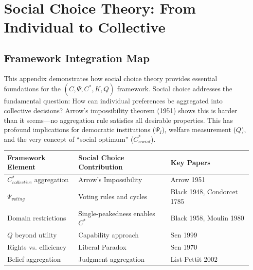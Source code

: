\section{Social Choice Theory: From Individual to Collective}
\label{app:social-choice}

\subsection{Framework Integration Map}

This appendix demonstrates how social choice theory provides essential 
foundations for the $(C, \Psi, C^*, K, Q)$ framework. Social choice addresses 
the fundamental question: How can individual preferences be aggregated into 
collective decisions? Arrow's impossibility theorem (1951) shows this is 
harder than it seems---no aggregation rule satisfies all desirable properties. 
This has profound implications for democratic institutions ($\Psi_I$), welfare 
measurement ($Q$), and the very concept of ``social optimum'' ($C^*_{social}$).

\begin{center}
\renewcommand{\arraystretch}{1.4}
\begin{tabular}{|l|l|l|}
\hline
\textbf{Framework Element} & \textbf{Social Choice Contribution} & \textbf{Key Papers} \\
\hline
$C^*_{collective}$ aggregation & Arrow's Impossibility & Arrow 1951 \\
$\Psi_{voting}$ & Voting rules and cycles & Black 1948, Condorcet 1785 \\
Domain restrictions & Single-peakedness enables $C^*$ & Black 1958, Moulin 1980 \\
$Q$ beyond utility & Capability approach & Sen 1999 \\
Rights vs. efficiency & Liberal Paradox & Sen 1970 \\
Belief aggregation & Judgment aggregation & List-Pettit 2002 \\
\hline
\end{tabular}
\end{center}

